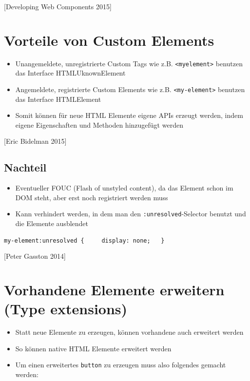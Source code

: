 \documentclass[11pt,a4paper]{report}
\providecommand{\tightlist}{%
  \setlength{\itemsep}{0pt}\setlength{\parskip}{0pt}}
\begin{document}
{[}Developing Web Components 2015{]}

\section{Vorteile von Custom
Elements}\label{vorteile-von-custom-elements}

\begin{itemize}
\tightlist
\item
  Unangemeldete, unregistrierte Custom Tags wie z.B.
  \texttt{\textless{}myelement\textgreater{}} benutzen das Interface
  HTMLUknownElement
\item
  Angemeldete, registrierte Custom Elements wie z.B.
  \texttt{\textless{}my-element\textgreater{}} benutzen das Interface
  HTMLElement
\item
  Somit können für neue HTML Elemente eigene APIs erzeugt werden, indem
  eigene Eigenschaften und Methoden hinzugefügt werden
\end{itemize}

{[}Eric Bidelman 2015{]}

\subsection{Nachteil}\label{nachteil}

\begin{itemize}
\tightlist
\item
  Eventueller FOUC (Flash of unstyled content), da das Element schon im
  DOM steht, aber erst noch registriert werden muss
\item
  Kann verhindert werden, in dem man den \texttt{:unresolved}-Selector
  benutzt und die Elemente ausblendet
\end{itemize}

\texttt{my-element:unresolved\ \{\ \ \ \ \ display:\ none;\ \ \ \}}

{[}Peter Gasston 2014{]}

\section{Vorhandene Elemente erweitern (Type
extensions)}\label{vorhandene-elemente-erweitern-type-extensions}

\begin{itemize}
\tightlist
\item
  Statt neue Elemente zu erzeugen, können vorhandene auch erweitert
  werden
\item
  So können native HTML Elemente erweitert werden
\item
  Um einen erweitertes \texttt{button} zu erzeugen muss also folgendes
  gemacht werden:
\end{itemize}
\end{document}
